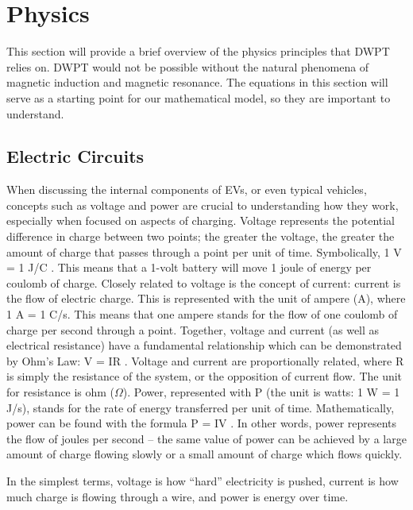 \section{Physics}
\label{sec: s2.3}
This section will provide a brief overview of the physics principles that DWPT relies on. 
DWPT would not be possible without the natural phenomena of magnetic induction and magnetic resonance. 
The equations in this section will serve as a starting point for our mathematical model, so they are 
important to understand.  

\subsection{Electric Circuits}
When discussing the internal components of EVs, or even typical vehicles, concepts such as voltage and 
power are crucial to understanding how they work, especially when focused on aspects of charging. 
Voltage represents the potential difference in charge between two points; the greater the voltage, 
the greater the amount of charge that passes through a point per unit of time. Symbolically, 1 V = 1 J/C 
\cite{young_university_2016}. This means that a 1-volt battery will move 1 joule of energy per coulomb of charge. 
Closely related to voltage is the concept of current: current is the flow of electric charge. 
This is represented with the unit of ampere (A), where 1 A = 1 C/s. This means that one ampere stands for 
the flow of one coulomb of charge per second through a point.  Together, voltage and current (as well as 
electrical resistance) have a fundamental relationship which can be demonstrated by Ohm’s Law: V = IR
\cite{young_university_2016}. Voltage and current are proportionally related, where R is simply the resistance 
of the system, or the opposition of current flow. The unit for resistance is ohm ($\Omega$). Power, represented with 
P (the unit is watts: 1 W = 1 J/s), stands for the rate of energy transferred per unit of time. Mathematically, 
power can be found with the formula P = IV \cite{young_university_2016}. In other words, power represents the 
flow of joules per second -- the same value of power can be achieved by a large amount of charge flowing 
slowly or a small amount of charge which flows quickly.

In the simplest terms, voltage is how “hard” electricity is pushed, current is how much charge is flowing 
through a wire, and power is energy over time.


